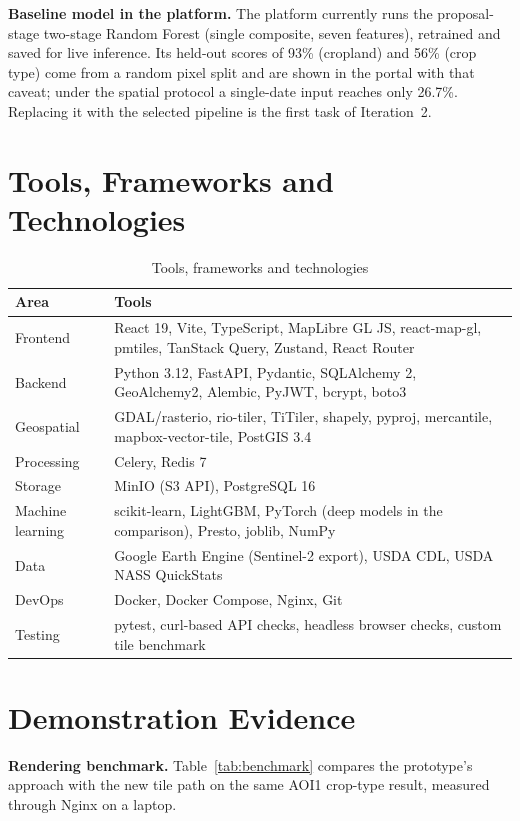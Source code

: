 \textbf{Baseline model in the platform.} The platform currently runs the proposal-stage two-stage
Random Forest (single composite, seven features), retrained and saved for live inference. Its
held-out scores of 93\% (cropland) and 56\% (crop type) come from a random pixel split and are shown
in the portal with that caveat; under the spatial protocol a single-date input reaches only 26.7\%.
Replacing it with the selected pipeline is the first task of Iteration~2.

\section{Tools, Frameworks and Technologies}
\begin{table}[htbp]
\centering\small
\caption{Tools, frameworks and technologies}
\label{tab:tools}
\begin{tabularx}{\textwidth}{L{3.2cm} Y}
\toprule
\textbf{Area} & \textbf{Tools}\\
\midrule
Frontend & React 19, Vite, TypeScript, MapLibre GL JS, react-map-gl, pmtiles, TanStack Query, Zustand, React Router\\
Backend & Python 3.12, FastAPI, Pydantic, SQLAlchemy 2, GeoAlchemy2, Alembic, PyJWT, bcrypt, boto3\\
Geospatial & GDAL/rasterio, rio-tiler, TiTiler, shapely, pyproj, mercantile, mapbox-vector-tile, PostGIS 3.4\\
Processing & Celery, Redis 7\\
Storage & MinIO (S3 API), PostgreSQL 16\\
Machine learning & scikit-learn, LightGBM, PyTorch (deep models in the comparison), Presto, joblib, NumPy\\
Data & Google Earth Engine (Sentinel-2 export), USDA CDL, USDA NASS QuickStats\\
DevOps & Docker, Docker Compose, Nginx, Git\\
Testing & pytest, curl-based API checks, headless browser checks, custom tile benchmark\\
\bottomrule
\end{tabularx}
\end{table}

\section{Demonstration Evidence}\label{sec:demo}
\textbf{Rendering benchmark.} Table~\ref{tab:benchmark} compares the prototype's approach with the new
tile path on the same AOI1 crop-type result, measured through Nginx on a laptop.

